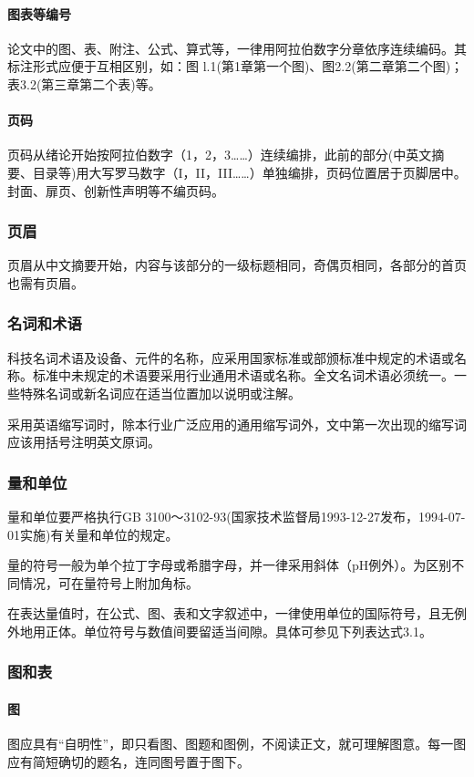 \paragraph{图表等编号}
论文中的图、表、附注、公式、算式等，一律用阿拉伯数字分章依序连续编码。其标注形式应便于互相区别，如：图 l.1(第1章第一个图)、图2.2(第二章第二个图)；表3.2(第三章第二个表)等。
\paragraph{页码}
页码从绪论开始按阿拉伯数字（1，2，3……）连续编排，此前的部分(中英文摘要、目录等)用大写罗马数字（I，II，III……）单独编排，页码位置居于页脚居中。封面、扉页、创新性声明等不编页码。
\subsubsection{页眉}
页眉从中文摘要开始，内容与该部分的一级标题相同，奇偶页相同，各部分的首页也需有页眉。
\subsubsection{名词和术语}
科技名词术语及设备、元件的名称，应采用国家标准或部颁标准中规定的术语或名称。标准中未规定的术语要采用行业通用术语或名称。全文名词术语必须统一。一些特殊名词或新名词应在适当位置加以说明或注解。

采用英语缩写词时，除本行业广泛应用的通用缩写词外，文中第一次出现的缩写词应该用括号注明英文原词。
\subsubsection{量和单位}
量和单位要严格执行GB 3100～3102-93(国家技术监督局1993-12-27发布，1994-07-01实施)有关量和单位的规定。

量的符号一般为单个拉丁字母或希腊字母，并一律采用斜体（pH例外）。为区别不同情况，可在量符号上附加角标。

在表达量值时，在公式、图、表和文字叙述中，一律使用单位的国际符号，且无例外地用正体。单位符号与数值间要留适当间隙。具体可参见下列表达式3.1。

\subsubsection{图和表}
\paragraph{图}
图应具有“自明性”，即只看图、图题和图例，不阅读正文，就可理解图意。每一图应有简短确切的题名，连同图号置于图下。


